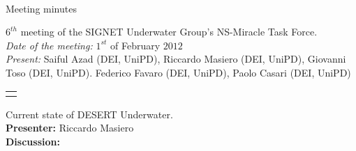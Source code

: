 \documentclass[11pt,journal,draftclsnofoot,onecolumn,twoside,letterpaper]{IEEEtran}
\theoremstyle{definition} \newtheorem{definition}[]{Definition}
\theoremstyle{theorem} \newtheorem{theorem}[]{Theorem}
\begin{document}
\pagestyle{empty}

\begin{Large} \\ \end{Large}
\begin{large} {Meeting minutes} \end{large}

\vspace{0.8cm}

 $6^{th}$ meeting of the SIGNET Underwater Group's NS-Miracle Task Force.\\
{\it Date of the meeting: } $1^{st}$ of February $2012$\\
{\it Present: } Saiful Azad (DEI, UniPD), Riccardo Masiero (DEI, UniPD), Giovanni Toso (DEI, UniPD). Federico Favaro (DEI, UniPD), Paolo Casari (DEI, UniPD)

\vspace{0.5cm}

\begin{tabular}{p{}}
 \hline \\
\end{tabular}

 Current state of DESERT Underwater.\\
{\bf Presenter:} Riccardo Masiero\\
{\bf Discussion:} 
\end{document}
